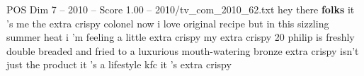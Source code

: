 \begin{textsample}{POS Dim 7 – 2010 – Score 1.00 – 2010/tv\_com\_2010\_62.txt}  \label{ex:f7_pos_078}
hey there \textbf{folks} it 's me the extra crispy colonel now i love original recipe but in this sizzling summer heat i 'm feeling a little extra crispy my extra crispy 20 philip is freshly double breaded and fried to a luxurious mouth-watering bronze extra crispy isn't just the product it 's a lifestyle kfc it 's extra crispy

\end{textsample}
